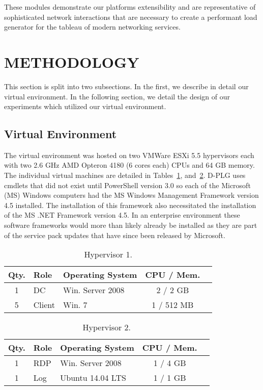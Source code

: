 These modules demonstrate our platforms extensibility and are representative of
sophisticated network interactions that are necessary to create a performant
load generator for the tableau of modern networking services.  

\section{\uppercase{Methodology}} \label{sec:methodology} 
\noindent This section is split into two subsections.  In the first, we
describe in detail our virtual environment.  In the following section, we
detail the design of our experiments which utilized our virtual environment.

\subsection{Virtual Environment}
\noindent The virtual environment was hosted on two VMWare ESXi 5.5 hypervisors
each with two 2.6 GHz AMD Opteron 4180 (6 cores each) CPUs and 64 GB memory.
The individual virtual machines are detailed in Tables~\ref{fig:hyp1},
and~\ref{fig:hyp2}.  D-PLG uses cmdlets that did not exist until PowerShell
version 3.0 so each of the Microsoft (MS) Windows computers had the MS Windows
Management Framework version 4.5 installed.  The installation of this framework
also necessitated the installation of the MS .NET Framework version 4.5.  In an
enterprise environment these software frameworks would more than likely already
be installed as they are part of the service pack updates that have since been
released by Microsoft.

\begin{table}[!ht] \centering
  \caption{Hypervisor 1.}
  \begin{tabular}{ | c | l | l | c | l |}
    \hline
    Qty. & Role   & Operating System & CPU / Mem. \\ \hline\hline
    1    & DC     & Win. Server 2008 & 2 / 2 GB   \\ \hline
    5    & Client & Win. 7           & 1 / 512 MB \\ 
    \hline
  \end{tabular}
  \label{fig:hyp1}
\end{table}

\begin{table}[!ht] \centering
  \caption{Hypervisor 2.}
  \begin{tabular}{ | c | l | l | c | l |}
    \hline
    Qty. & Role & Operating System & CPU / Mem. \\ \hline\hline
    1    & RDP  & Win. Server 2008 & 1 / 4 GB   \\ \hline
    1    & Log  & Ubuntu 14.04 LTS & 1 / 1 GB   \\ 
    \hline
  \end{tabular}
  \label{fig:hyp2}
\end{table}

